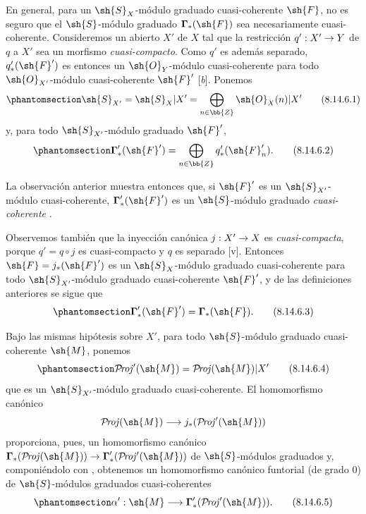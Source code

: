 \documentclass[oneside,10pt]{amsart}
\makeatletter
\newcommand{\ega@arrow}[2]{\mathchoice{#1}{#2}{#2}{#2}}
\renewcommand{\to}{\ega@arrow{\longrightarrow}{\rightarrow}}
\def\shProj{\mathcal{P}\!\mathit{roj}}
\let\EGAOriginalLabel\label
\renewcommand{\label}[1]{\phantomsection\EGAOriginalLabel{#1}}
\makeatother
\begin{document}
\begin{env}[8.14.6]
\label{II.8.14.6}
En general, para un $\sh{S}_X$-módulo graduado cuasi-coherente $\sh{F}$, no es seguro que el $\sh{S}$-módulo graduado $\boldsymbol{\Gamma}_*(\sh{F})$ sea necesariamente cuasi-coherente.
Consideremos un abierto $X'$ de $X$ tal que la restricción $q':X'\to Y$ de $q$ a $X'$ sea un morfismo \emph{cuasi-compacto}.
Como $q'$ es además separado, $q'_*(\sh{F}')$ es entonces un $\sh{O}_Y$-módulo cuasi-coherente para todo $\sh{O}_{X'}$-módulo cuasi-coherente $\sh{F}'$ [\emph{b}].
Ponemos
\[
\label{II.8.14.6.1}
    \sh{S}_{X'} = \sh{S}_X|X' = \bigoplus_{n\in\bb{Z}}\sh{O}_X(n)|X'
\tag{8.14.6.1}
\]
y, para todo $\sh{S}_{X'}$-módulo graduado $\sh{F}'$,
\[
\label{II.8.14.6.2}
    \boldsymbol{\Gamma}'_*(\sh{F}') = \bigoplus_{n\in\bb{Z}}q'_*(\sh{F}'_n).
\tag{8.14.6.2}
\]

La observación anterior muestra entonces que, si $\sh{F}'$ es un $\sh{S}_{X'}$-módulo cuasi-coherente, $\boldsymbol{\Gamma}'_*(\sh{F}')$ es un $\sh{S}$-módulo graduado \emph{cuasi-coherente} .

Observemos también que la inyección canónica $j:X'\to X$ es \emph{cuasi-compacta}, porque $q'=q\circ j$ es cuasi-compacto y $q$ es separado [v].
Entonces $\sh{F}=j_*(\sh{F}')$ es un $\sh{S}_X$-módulo graduado cuasi-coherente para todo $\sh{S}_{X'}$-módulo graduado cuasi-coherente $\sh{F}'$, y de las definiciones anteriores se sigue que
\[
\label{II.8.14.6.3}
    \boldsymbol{\Gamma}'_*(\sh{F}') = \boldsymbol{\Gamma}_*(\sh{F}).
\tag{8.14.6.3}
\]

Bajo las mismas hipótesis sobre $X'$, para todo $\sh{S}$-módulo graduado cuasi-coherente $\sh{M}$, ponemos
\[
\label{II.8.14.6.4}
    \shProj'(\sh{M}) = \shProj(\sh{M})|X'
\tag{8.14.6.4}
\]
que es un $\sh{S}_{X'}$-módulo graduado cuasi-coherente.
El homomorfismo canónico
\[
    \shProj(\sh{M}) \to j_*(\shProj'(\sh{M}))
\]
 proporciona, pues, un homomorfismo canónico $\boldsymbol{\Gamma}_*(\shProj(\sh{M}))\to\boldsymbol{\Gamma}'_*(\shProj'(\sh{M}))$ de $\sh{S}$-módulos graduados y, componiéndolo con , obtenemos un homomorfismo canónico funtorial (de grado $0$) de $\sh{S}$-módulos graduados cuasi-coherentes
\[
\label{II.8.14.6.5}
    \alpha': \sh{M} \to \boldsymbol{\Gamma}'_*(\shProj'(\sh{M})).
\tag{8.14.6.5}
\]
\end{env}
\end{document}
